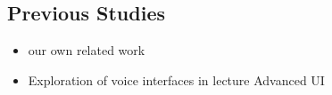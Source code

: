 \subsection{Previous Studies}

\begin{itemize}
    \item our own related work 
    \item Exploration of voice interfaces in lecture Advanced UI
\end{itemize}
